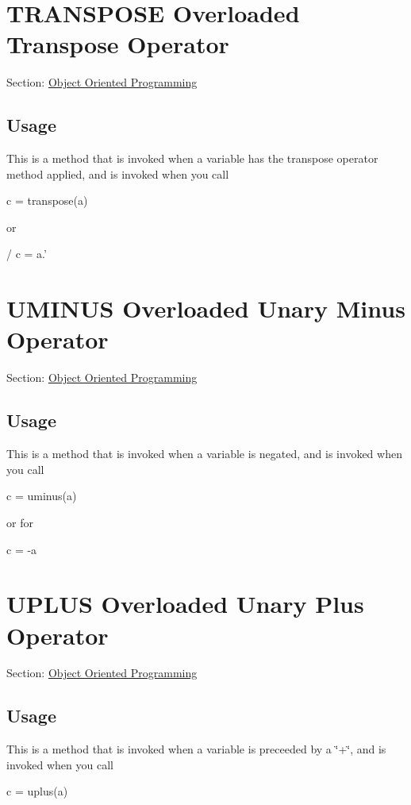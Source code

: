  \hypertarget{class_transpose}{}\section{T\-R\-A\-N\-S\-P\-O\-S\-E Overloaded Transpose Operator}\label{class_transpose}
Section\-: \hyperlink{sec_class}{Object Oriented Programming} \hypertarget{vtkwidgets_vtkxyplotwidget_Usage}{}\subsection{Usage}\label{vtkwidgets_vtkxyplotwidget_Usage}
This is a method that is invoked when a variable has the transpose operator method applied, and is invoked when you call \begin{DoxyVerb}   c = transpose(a)
\end{DoxyVerb}
 or \begin{DoxyVerb}/  c = a.'
\end{DoxyVerb}
 \hypertarget{class_uminus}{}\section{U\-M\-I\-N\-U\-S Overloaded Unary Minus Operator}\label{class_uminus}
Section\-: \hyperlink{sec_class}{Object Oriented Programming} \hypertarget{vtkwidgets_vtkxyplotwidget_Usage}{}\subsection{Usage}\label{vtkwidgets_vtkxyplotwidget_Usage}
This is a method that is invoked when a variable is negated, and is invoked when you call \begin{DoxyVerb}   c = uminus(a)
\end{DoxyVerb}
 or for \begin{DoxyVerb}   c = -a
\end{DoxyVerb}
 \hypertarget{class_uplus}{}\section{U\-P\-L\-U\-S Overloaded Unary Plus Operator}\label{class_uplus}
Section\-: \hyperlink{sec_class}{Object Oriented Programming} \hypertarget{vtkwidgets_vtkxyplotwidget_Usage}{}\subsection{Usage}\label{vtkwidgets_vtkxyplotwidget_Usage}
This is a method that is invoked when a variable is preceeded by a \char`\"{}+\char`\"{}, and is invoked when you call \begin{DoxyVerb}   c = uplus(a)
\end{DoxyVerb}
